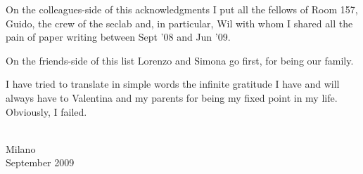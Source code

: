 \documentclass[10pt,a4paper,twoside]{memoir} %
\begin{document}
On the colleagues-side of this acknowledgments I put all the fellows of Room 157, Guido, the crew of the seclab and, in particular, Wil with whom I shared all the pain of paper writing between Sept '08 and Jun '09.

On the friends-side of this list Lorenzo and Simona go first, for being our family.

I have tried to translate in simple words the infinite gratitude I have and will always have to Valentina and my parents for being my fixed point in my life. Obviously, I failed.

\begin{flushright}
\textsc{\theauthor}\\
Milano\\
September 2009
\end{flushright}

\cleartoverso %

\end{document}
